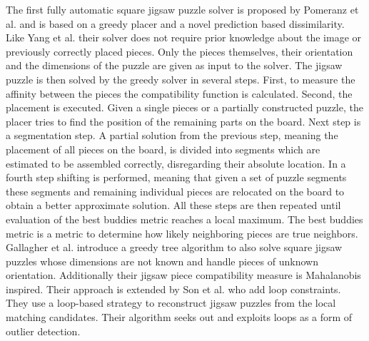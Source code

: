 \documentclass[11pt]{report}
\begin{document}
The first fully automatic square jigsaw puzzle solver is proposed by Pomeranz et
al. \cite{Pomeranz2011} and is based on a greedy placer and a novel prediction
based dissimilarity. Like Yang et al. \cite{yang2011particle} their solver does
not require prior knowledge about the image or previously correctly placed
pieces. Only the pieces themselves, their orientation and the dimensions of the
puzzle are given as input to the solver. The jigsaw puzzle is then solved by the
greedy solver in several steps. First, to measure the affinity between the
pieces the compatibility function is calculated. Second, the placement is
executed. Given a single pieces or a partially constructed puzzle, the placer
tries to find the position of the remaining parts on the board. Next step is a
segmentation step. A partial solution from the previous step, meaning the
placement of all pieces on the board, is divided into segments which are
estimated to be assembled correctly, disregarding their absolute location. In a
fourth step shifting is performed, meaning that given a set of puzzle segments
these segments and remaining individual pieces are relocated on the board to
obtain a better approximate solution. All these steps are then repeated until
evaluation of the best buddies metric reaches a local maximum. The best buddies
metric is a metric to determine how likely neighboring pieces are true
neighbors. Gallagher et al. \cite{gallagher2012jigsaw} introduce a greedy tree
algorithm to also solve square jigsaw puzzles whose dimensions are not known and handle pieces
of unknown orientation. Additionally their jigsaw piece compatibility measure is
Mahalanobis inspired. Their approach is extended by Son et al.
\cite{son2014solving} who add loop constraints. They use a loop-based strategy
to reconstruct jigsaw puzzles from the local matching candidates. Their
algorithm seeks out and exploits loops as a form of outlier detection.
\end{document}
